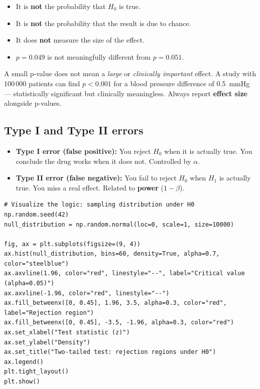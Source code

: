 \begin{itemize}
  \item It is \textbf{not} the probability that $H_0$ is true.
  \item It is \textbf{not} the probability that the result is due to chance.
  \item It does \textbf{not} measure the size of the effect.
  \item $p = 0.049$ is not meaningfully different from $p = 0.051$.
\end{itemize}

\begin{warningbox}
A small p-value does not mean a \emph{large} or \emph{clinically important} effect. A study with 100\,000 patients can find $p < 0.001$ for a blood pressure difference of 0.5~mmHg --- statistically significant but clinically meaningless. Always report \textbf{effect size} alongside p-values.
\end{warningbox}

\subsection{Type I and Type II errors}

\begin{itemize}
  \item \textbf{Type I error (false positive):} You reject $H_0$ when it is actually true. You conclude the drug works when it does not. Controlled by $\alpha$.
  \item \textbf{Type II error (false negative):} You fail to reject $H_0$ when $H_1$ is actually true. You miss a real effect. Related to \textbf{power} ($1 - \beta$).
\end{itemize}

\begin{verbatim}
# Visualize the logic: sampling distribution under H0
np.random.seed(42)
null_distribution = np.random.normal(loc=0, scale=1, size=10000)

fig, ax = plt.subplots(figsize=(9, 4))
ax.hist(null_distribution, bins=60, density=True, alpha=0.7, color="steelblue")
ax.axvline(1.96, color="red", linestyle="--", label="Critical value (alpha=0.05)")
ax.axvline(-1.96, color="red", linestyle="--")
ax.fill_betweenx([0, 0.45], 1.96, 3.5, alpha=0.3, color="red", label="Rejection region")
ax.fill_betweenx([0, 0.45], -3.5, -1.96, alpha=0.3, color="red")
ax.set_xlabel("Test statistic (z)")
ax.set_ylabel("Density")
ax.set_title("Two-tailed test: rejection regions under H0")
ax.legend()
plt.tight_layout()
plt.show()
\end{verbatim}

